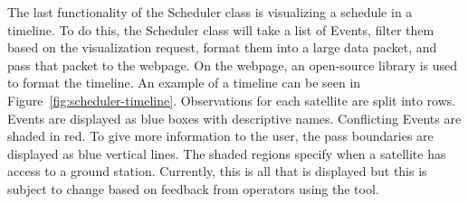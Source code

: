 The last functionality of the Scheduler class is visualizing a schedule in a
timeline. To do this, the Scheduler class will take a list of Events, filter
them based on the visualization request, format them into a large data packet,
and pass that packet to the webpage. On the webpage, an open-source library is
used to format the timeline. An example of a timeline can be seen in
Figure~\ref{fig:scheduler-timeline}. Observations for each satellite are split
into rows. Events are displayed as blue boxes with descriptive names.
Conflicting Events are shaded in red. To give more information to the user, the
pass boundaries are displayed as blue vertical lines. The shaded regions
specify when a satellite has access to a ground station.  Currently, this is
all that is displayed but this is subject to change based on feedback from operators
using the tool.










